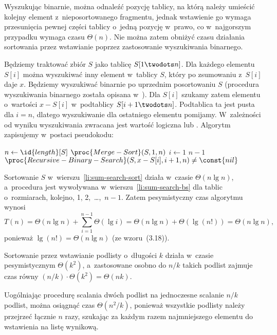 \exercise %
Wyszukując binarnie, można odnaleźć pozycję tablicy, na którą należy umieścić kolejny element z~nieposortowanego fragmentu, jednak wstawienie go wymaga przesunięcia pewnej części tablicy o~jedną pozycję w~prawo, co w~najgorszym przypadku wymaga czasu $\Theta(n)$. Nie można zatem obniżyć czasu działania sortowania przez wstawianie poprzez zastosowanie wyszukiwania binarnego.

\exercise %
Będziemy traktować zbiór $S$ jako tablicę $S[1\twodots n]$. Dla każdego elementu $S[i]$ można wyszukiwać inny element w~tablicy $S$, który po zsumowaniu z~$S[i]$ daje $x$. Będziemy wyszukiwać binarnie po uprzednim posortowaniu $S$ (procedura wyszukiwania binarnego została opisana w~). Dla $S[i]$ szukamy zatem elementu o~wartości $x-S[i]$ w~podtablicy $S[i+1\twodots n]$. Podtablica ta jest pusta dla $i=n$, dlatego wyszukiwanie dla ostatniego elementu pomijamy. W~zależności od wyniku wyszukiwania zwracana jest wartość logiczna  lub . Algorytm zapisujemy w~postaci pseudokodu:
\begin{codebox}
\li	$n\gets\id{length}[S]$
\li	$\proc{Merge-Sort}(S,1,n)$ \label{li:sum-search-sort}
\li	\For $i\gets1$ \To $n-1$
\li		\Do
			\If $\proc{Recursive-Binary-Search}(S,x-S[i],i+1,n)\ne\const{nil}$ \label{li:sum-search-bs}
\li				\Then \Return {}
				\End
		\End
\li	\Return {}
\end{codebox}

Sortowanie $S$ w~wierszu~\ref{li:sum-search-sort} działa w~czasie $\Theta(n\lg n)$, a~procedura  jest wywoływana w~wierszu~\ref{li:sum-search-bs} dla tablic o~rozmiarach, kolejno, 1, 2,~\dots,~$n-1$. Zatem pesymistyczny czas algorytmu  wynosi
\[
	T(n) = \Theta(n\lg n)+\sum_{i=1}^{n-1}\Theta(\lg i) = \Theta(n\lg n)+\Theta(\lg(n!)) = \Theta(n\lg n),
\]
ponieważ $\lg(n!)=\Theta(n\lg n)$ (ze wzoru~(3.18)).

\problems


\subproblem %
Sortowanie przez wstawianie podlisty o~długości $k$ działa w~czasie pesymistycznym $\Theta(k^2)$, a~zastosowane osobno do $n/k$ takich podlist zajmuje czas równy $(n/k)\cdot\Theta(k^2)=\Theta(nk)$.

\subproblem %
Uogólniając procedurę scalania dwóch podlist na jednoczesne scalanie $n/k$ podlist, można osiągnąć czas $\Theta(n^2\!/k)$, ponieważ wszystkie podlisty należy przejrzeć łącznie $n$ razy, szukając za każdym razem najmniejszego elementu do wstawienia na listę wynikową.

